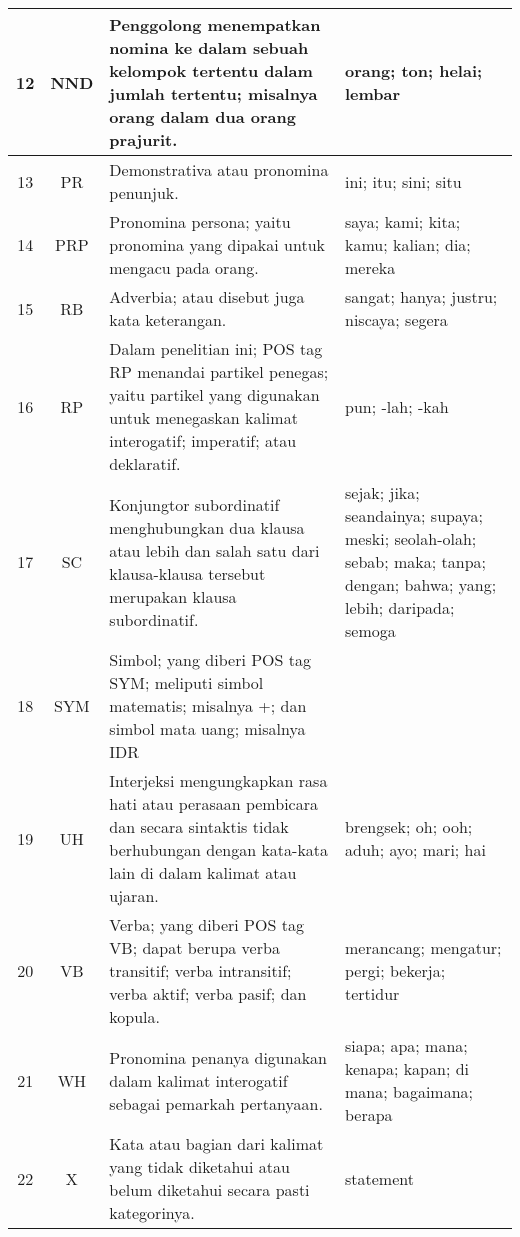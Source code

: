 \begin{longtable}{|c|c|p{}|p{}|}
	12 & NND & Penggolong menempatkan nomina ke dalam sebuah kelompok tertentu dalam jumlah tertentu; misalnya orang dalam dua orang prajurit. & orang; ton; helai; lembar \\ \hline
	13 & PR & Demonstrativa atau pronomina penunjuk. & ini; itu; sini; situ \\ \hline
	14 & PRP & Pronomina persona; yaitu pronomina yang dipakai untuk mengacu pada orang. & saya; kami; kita; kamu; kalian; dia; mereka \\ \hline
	15 & RB & Adverbia; atau disebut juga kata keterangan. & sangat; hanya; justru; niscaya; segera \\ \hline
	16 & RP & Dalam penelitian ini; POS tag RP menandai partikel penegas; yaitu partikel yang digunakan untuk menegaskan kalimat interogatif; imperatif; atau deklaratif. & pun; -lah; -kah \\ \hline
	17 & SC & Konjungtor subordinatif menghubungkan dua klausa atau lebih dan salah satu dari klausa-klausa tersebut merupakan klausa subordinatif. & sejak; jika; seandainya; supaya; meski; seolah-olah; sebab; maka; tanpa; dengan; bahwa; yang; lebih; daripada; semoga \\ \hline
	18 & SYM & Simbol; yang diberi POS tag SYM; meliputi simbol matematis; misalnya +; dan simbol mata uang; misalnya IDR &  \\ \hline
	19 & UH & Interjeksi mengungkapkan rasa hati atau perasaan pembicara dan secara sintaktis tidak berhubungan dengan kata-kata lain di dalam kalimat atau ujaran. & brengsek; oh; ooh; aduh; ayo; mari; hai \\ \hline
	20 & VB & Verba; yang diberi POS tag VB; dapat berupa verba transitif; verba intransitif; verba aktif; verba pasif; dan kopula. & merancang; mengatur; pergi; bekerja; tertidur \\ \hline
	21 & WH & Pronomina penanya digunakan dalam kalimat interogatif sebagai pemarkah pertanyaan. & siapa; apa; mana; kenapa; kapan; di mana; bagaimana; berapa \\ \hline
	22 & X & Kata atau bagian dari kalimat yang tidak diketahui atau belum diketahui secara pasti kategorinya. & statement \\ \hline
\end{longtable}